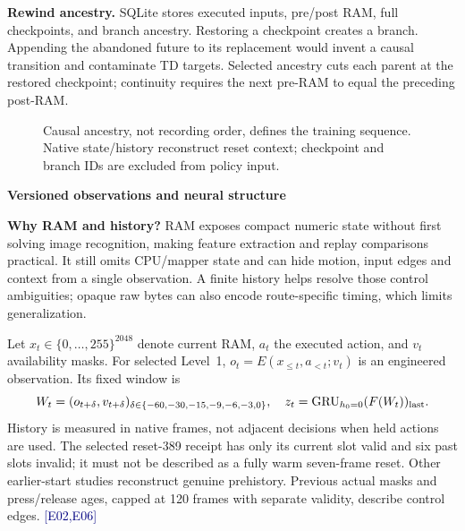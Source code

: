\documentclass[11pt,a4paper]{article}
\newcommand{\topic}[2]{\vspace*{-4mm}{\small\color{teal}\textbf{#1}}\par{\LARGE\bfseries #2}\par\vspace{3mm}}
\newcommand{\ev}[1]{{\small\textcolor{navy}{[#1]}}}
\begin{document}
\textbf{Rewind ancestry.} SQLite stores executed inputs, pre/post RAM, full checkpoints, and branch ancestry. Restoring a checkpoint creates a branch. Appending the abandoned future to its replacement would invent a causal transition and contaminate TD targets. Selected ancestry cuts each parent at the restored checkpoint; continuity requires the next pre-RAM to equal the preceding post-RAM.

\begin{figure}[ht]\centering
{}
\caption{Causal ancestry, not recording order, defines the training sequence. Native state/history reconstruct reset context; checkpoint and branch IDs are excluded from policy input.}\label{fig:ancestry}
\end{figure}

\newpage
\topic{03 / REPRESENTATION}{Versioned observations and neural structure}
\textbf{Why RAM and history?} RAM exposes compact numeric state without first solving image recognition, making feature extraction and replay comparisons practical. It still omits CPU/mapper state and can hide motion, input edges and context from a single observation. A finite history helps resolve those control ambiguities; opaque raw bytes can also encode route-specific timing, which limits generalization.

Let $x_t\in\{0,\ldots,255\}^{2048}$ denote current RAM, $a_t$ the executed action, and $v_t$ availability masks. For selected Level~1, $o_t=E(x_{\le t},a_{<t};v_t)$ is an engineered observation. Its fixed window is
\begin{equation}\label{eq:window}
 W_t=(o_{t+\delta},v_{t+\delta})_{\delta\in\{-60,-30,-15,-9,-6,-3,0\}},\quad
 z_t=\operatorname{GRU}_{h_0=0}(F(W_t))_{\rm last}.
\end{equation}
History is measured in native frames, not adjacent decisions when held actions are used. The selected reset-389 receipt has only its current slot valid and six past slots invalid; it must not be described as a fully warm seven-frame reset. Other earlier-start studies reconstruct genuine prehistory. Previous actual masks and press/release ages, capped at 120 frames with separate validity, describe control edges. \ev{E02,E06}
\end{document}
